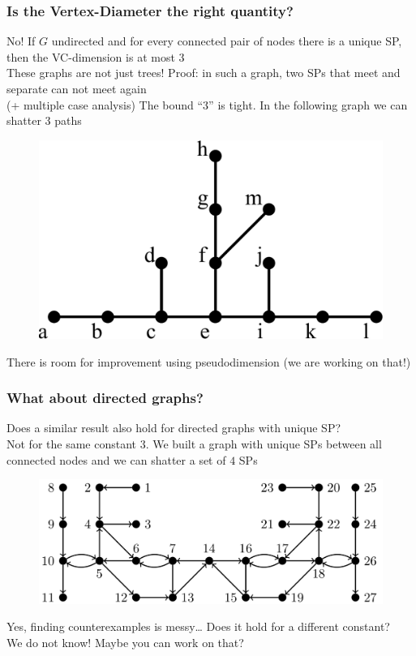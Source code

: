\begin{frame}
  \frametitle{Is the Vertex-Diameter the right quantity?}
  No! If $G$ undirected and for every connected pair of nodes there is a
  unique SP, then the VC-dimension is at most 3\\
  \quad These graphs are not just trees!
  \vfill
  Proof: in such a graph, two SPs that meet and separate can not meet again\\
  \quad (+ multiple case analysis)
  \vfill
  The bound ``3'' is tight. In the following graph we can shatter 3 paths
  \begin{figure}[H]
    \centering
    \includegraphics[scale=0.3]{imgs/uniqueshortestpathtight.pdf}
  \end{figure}
  \vfill
  There is room for improvement using pseudodimension (we are working on that!)
\end{frame}

\begin{frame}
  \frametitle{What about directed graphs?}
  Does a similar result also hold for directed graphs with unique SP?\\
  \quad  Not for the same constant $3$. We built a graph with unique SPs between
  all connected nodes and we can shatter a set of $4$ SPs
  \begin{figure}[H]
    \centering
    \includegraphics[scale=0.3]{imgs/uniquedirected.pdf}
  \end{figure}
  Yes, finding counterexamples is messy\ldots
  \vfill
  Does it hold for a different constant?\\
  \quad We do not know! Maybe you can work on that?
\end{frame}

